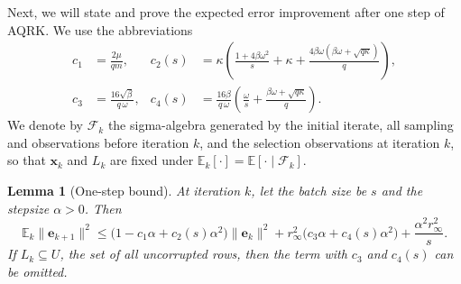 \documentclass[pdflatex,sn-mathphys-num]{sn-jnl}
\theoremstyle{thmstyleone}
\newtheorem{lemma}{Lemma}
\theoremstyle{thmstylethree}
\newcommand{\vx}{\mathbf{x}}
\newcommand{\ve}{\mathbf{e}}
\begin{document}
Next, we will state and prove the expected error improvement after one step of AQRK. 
We use the abbreviations
\begin{equation}
\label{eq:proof_constants}
\begin{aligned}
c_1&=\frac{2\mu}{qm}, &
c_2(s)&=\kappa\left(\frac{1+4\beta\omega^2}{s}+\kappa
+\frac{4\beta\omega(\beta\omega+\sqrt{q\kappa})}{q}\right),\\
c_3&=\frac{16\sqrt\beta}{q\,\omega}, &
c_4(s)&=\frac{16\beta}{q\,\omega}\left(\frac{\omega}{s}
+\frac{\beta\omega+\sqrt{q\kappa}}{q}\right).
\end{aligned}
\end{equation}
We denote by $\mathcal F_k$ the sigma-algebra generated by the initial iterate, all sampling and
observations before iteration $k$, and the selection observations at
iteration $k$, so that $\vx_k$ and $L_k$ are fixed under
$\mathbb E_k[\cdot]=\mathbb E[\cdot\mid\mathcal F_k]$. 

\begin{lemma}[One-step bound]
\label{lem:onestep_update}
At iteration $k$, let the batch size be $s$ and the stepsize $\alpha>0$.
Then
\begin{equation}
\label{eq:onestep_general}
\mathbb E_k\|\ve_{k+1}\|^2
\le\bigl(1-c_1\alpha+c_2(s)\alpha^2\bigr)\|\ve_k\|^2
+r_\infty^2\bigl(c_3\alpha+c_4(s)\alpha^2\bigr)
+\frac{\alpha^2r_\infty^2}{s}.
\end{equation}
If $L_k\subseteq U$, the set
of all uncorrupted rows, then the term with $c_3$ and $c_4(s)$ can be omitted.
\end{lemma}
\end{document}
